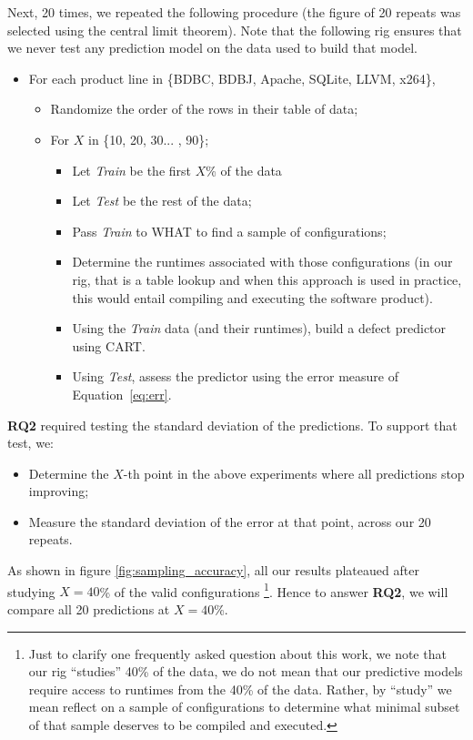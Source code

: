 \documentclass{sig-alternative}
\newcommand{\bi}{\begin{itemize}}%
\newcommand{\ei}{\end{itemize}}
\newcommand{\eq}[1]{Equation~\ref{eq:#1}}
\begin{document}
Next, 20 times, we repeated the following procedure (the figure of 20 repeats was
selected using the central limit theorem). Note that the following rig ensures that
we never test any prediction model on the data used to build that model.
\bi
\item For each  product line in \{BDBC, BDBJ, Apache, SQLite, LLVM, x264\},
\bi
\item Randomize the order of the rows in their table of data;
\item For $X$ in \{10, 20, 30... , 90\};
\bi
\item Let {\em Train} be the first $X$\% of the data 
\item Let {\em Test} be the rest of the data;
\item Pass {\em Train} to WHAT to find a sample of configurations;
\item Determine the runtimes associated with those configurations (in our rig, that is a table lookup and when
this approach is used in practice, this would entail compiling and executing the software product).
\item Using the {\em Train}  data (and their runtimes), build a defect predictor using CART.
\item Using {\em Test}, assess the predictor using the error 
measure of \eq{err}.
\ei
\ei
\ei
{\bf RQ2} required testing the standard deviation of the predictions. To support that test, we:
\bi
\item Determine the $X$-th point in the above experiments where all predictions stop improving;
\item Measure the standard deviation of the error at that point, across our 20 repeats.
\ei
As shown in figure \ref{fig:sampling_accuracy}, all our results plateaued after studying $X=40$\% of the valid configurations
 \footnote{Just to clarify one frequently asked question about this work, we note
that our rig ``studies'' 40\% of the data, we do not mean that our predictive models
 require access to runtimes from the 40\% of the data. Rather, by ``study'' we mean   reflect 
 on a sample of configurations to determine what minimal subset of that
sample deserves to be compiled and executed.}.
 Hence to answer {\bf RQ2}, we will compare all 20 predictions at $X=40$\%.
 
\end{document}
